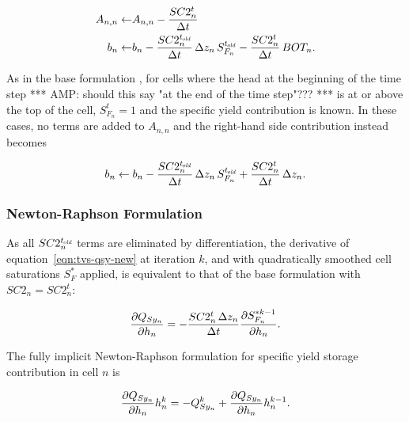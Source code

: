 \begin{equation}
	\label{eqn:tvs-sy-Ab-std}
	\begin{aligned}
		A_{n,n} \leftarrow & A_{n,n} - \frac{SC2_n^t}{\Delta t} \\
		b_n \leftarrow & b_n - \frac{SC2_n^{t_\mathit{\kern -0.07em old}}}{\Delta t} \, \Delta z_n \, S_{F_n}^{t_\mathit{\kern -0.07em old}} - \frac{SC2_n^t}{\Delta t} \, BOT_n .
	\end{aligned}
\end{equation}

\noindent As in the base formulation \citep[Chapter 5]{modflow6gwf}, for cells where the head at the beginning of the time step {\color{red} *** AMP: should this say "at the end of the time step"??? ***} is at or above the top of the cell, $S_{F_n}^t = 1$ and the specific yield contribution is known. In these cases, no terms are added to $A_{n,n}$ and the right-hand side contribution instead becomes

\begin{equation}
	\label{eqn:tvs-sy-b-fullsat}
	b_n \leftarrow b_n - \frac{SC2_n^{t_\mathit{\kern -0.07em old}}}{\Delta t} \, \Delta z_n \, S_{F_n}^{t_\mathit{\kern -0.07em old}} + \frac{SC2_n^t}{\Delta t} \, \Delta z_n .
\end{equation}


\subsubsection{Newton-Raphson Formulation}

As all $SC2_n^{t_\mathit{\kern -0.07em old}}$ terms are eliminated by differentiation, the derivative of equation~\ref{eqn:tvs-qsy-new} at iteration $k$, and with quadratically smoothed cell saturations $S_F^*$ applied, is equivalent to that of the base formulation \citep[eq. 5--14]{modflow6gwf} with $SC2_n = SC2_n^t$:

\begin{equation}
	\label{eqn:tvs-qsy-nr-deriv}
	\frac{\partial Q_{Sy_n}}{\partial h_n} = - \frac{SC2_n^t \, \Delta z_n}{\Delta t} \frac{\partial S_{F_n}^{\ast k-1}}{\partial h_n} .
\end{equation}

\noindent The fully implicit Newton-Raphson formulation for specific yield storage contribution in cell $n$ is

\begin{equation}
	\label{eqn:tvs-sy-nr}
	\frac{\partial Q_{Sy_n}}{\partial h_n} h_n^k = -Q_{Sy_n}^k + \frac{\partial Q_{Sy_n}}{\partial h_n} h_n^{k-1} .
\end{equation}

